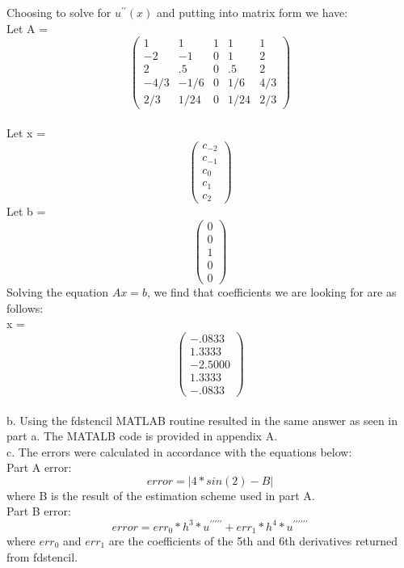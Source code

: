 \documentclass[titlepage]{article}
\begin{document}
Choosing to solve for $u^{\prime \prime}(x)$ and putting into matrix form we have: \\
Let A = \[ \left( \begin{array}{ccccc}
1 & 1 & 1 & 1 & 1\\
-2 & -1 & 0 & 1 & 2\\
2 & .5 & 0 & .5 & 2\\
-4/3 & -1/6 & 0 & 1/6 &4/3\\
2/3 & 1/24 & 0 & 1/24 & 2/3 \end{array} \right)\] \\
Let x = \[\left(\begin{array}{c} c_{-2}\\ c_{-1}\\ c_0\\ c_1\\ c_2\end{array}\right)\]
Let b = \[\left(\begin{array}{c} 0\\ 0\\ 1\\ 0\\ 0\end{array}\right)\]
Solving the equation  $Ax=b$, we find that coefficients we are looking for are as follows: \\
x = \[\left(\begin{array}{c} -.0833\\ 1.3333\\ -2.5000\\ 1.3333\\ -.0833\end{array}\right)\]\\
b. Using the fdstencil MATLAB routine resulted in the same answer as seen in part a. The MATALB code is provided in appendix A.\\
c. The errors were calculated in accordance with the equations below:\\
Part A error:
\begin{equation*}
error = |4*sin(2)-B|
\end{equation*}
where B is the result of the estimation scheme used in part A.\\
Part B error:
\begin{equation*}
error = err_0*h^3*u^{\prime \prime \prime \prime \prime} + err_1*h^4*u^{\prime \prime \prime \prime \prime \prime}
\end{equation*}
where $err_0$ and $err_1$ are the coefficients of the 5th and 6th derivatives returned from fdstencil.\\
\end{document}

